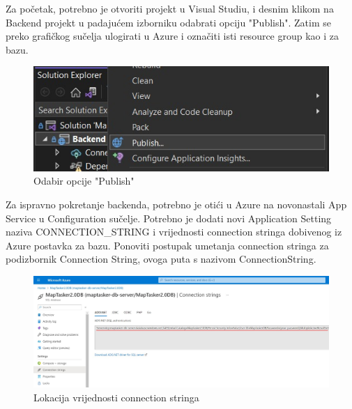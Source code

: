 		\noindent Za početak, potrebno je otvoriti projekt u Visual Studiu, i desnim klikom na Backend projekt u padajućem izborniku odabrati opciju "Publish". Zatim se preko grafičkog sučelja ulogirati u Azure i označiti isti resource group kao i za bazu.

		\vspace{10mm}

		\begin{figure}[H]
			 \includegraphics[width=\linewidth]{./slike/backend1.jpg}
			  \centering
			  \caption{Odabir opcije "Publish"}
		  \end{figure}
		  
		\vspace{10mm}

		\noindent Za ispravno pokretanje backenda, potrebno je otići u Azure na novonastali App Service u Configuration sučelje. Potrebno je dodati novi Application Setting naziva CONNECTION\_STRING i vrijednosti connection stringa dobivenog iz Azure postavka za bazu. Ponoviti postupak umetanja connection stringa za podizbornik Connection String, ovoga puta s nazivom ConnectionString. 

		\vspace{10mm}

		\begin{figure}[H]
			 \includegraphics[width=\linewidth]{./slike/backend1a.jpg}
			  \centering
			  \caption{Lokacija vrijednosti connection stringa}
		  \end{figure}
		  
		\vspace{20mm}

